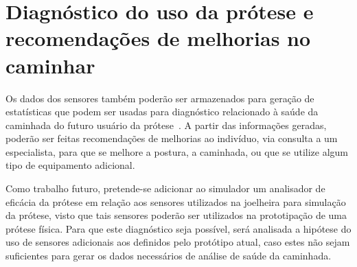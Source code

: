\section{Diagnóstico do uso da prótese e recomendações de melhorias no caminhar}\label{sec:metodo_diagnostico}

Os dados dos sensores também poderão ser armazenados para geração de estatísticas que podem ser usadas para diagnóstico relacionado à saúde da caminhada do futuro usuário da prótese~\cite{SabatiniMSC05}.
A partir das informações geradas, poderão ser feitas recomendações de melhorias ao indivíduo, via consulta a um especialista, para que se melhore a postura, a caminhada, ou que se utilize algum tipo de equipamento adicional. 

Como trabalho futuro, pretende-se adicionar ao simulador um analisador de eficácia da prótese em relação aos sensores utilizados na joelheira para simulação da prótese, visto que tais sensores poderão ser utilizados na prototipação de uma prótese física. Para que este diagnóstico seja possível, será analisada a hipótese do uso de sensores adicionais aos definidos pelo protótipo atual, caso estes não sejam suficientes para gerar os dados necessários de análise de saúde da caminhada.